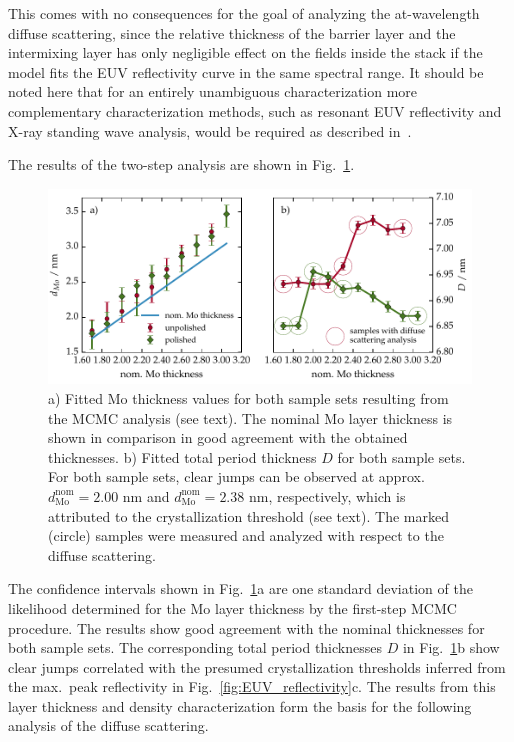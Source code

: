 This comes with no consequences for the goal of analyzing the at-wavelength diffuse scattering, since the relative thickness of the barrier layer and the intermixing layer has only negligible effect on the fields inside the stack if the model fits the EUV reflectivity curve in the same spectral range. It should be noted here that for an entirely unambiguous characterization more complementary characterization methods, such as resonant EUV reflectivity and X-ray standing wave analysis, would be required as described in~\cite{haase_multiparameter_2016}.

The results of the two-step analysis are shown in Fig.~\ref{fig:fitted_mo_and_fitted_D}.
\begin{figure}[htbp]
\centering
\includegraphics[width=\textwidth]{img/fitted_mo_and_fitted_D}
\caption{a) Fitted Mo thickness values for both sample sets resulting from the MCMC analysis (see text). The nominal Mo layer thickness is shown in comparison in good agreement with the obtained thicknesses. b) Fitted total period thickness $D$ for both sample sets. For both sample sets, clear jumps can be observed at approx.~$d^\text{nom}_\text{Mo} =2.00$ nm and $d^\text{nom}_\text{Mo} =2.38$ nm, respectively, which is attributed to the crystallization threshold (see text). The marked (circle) samples were measured and analyzed with respect to the diffuse scattering.}
\label{fig:fitted_mo_and_fitted_D}
\end{figure}
The confidence intervals shown in Fig.~\ref{fig:fitted_mo_and_fitted_D}a are one standard deviation of the likelihood determined for the Mo layer thickness by the first-step MCMC procedure. The results show good agreement with the nominal thicknesses for both sample sets. The corresponding total period thicknesses $D$ in Fig.~\ref{fig:fitted_mo_and_fitted_D}b show clear jumps correlated with the presumed crystallization thresholds inferred from the max.~peak reflectivity in Fig.~\ref{fig:EUV_reflectivity}c. The results from this layer thickness and density characterization form the basis for the following analysis of the diffuse scattering.




